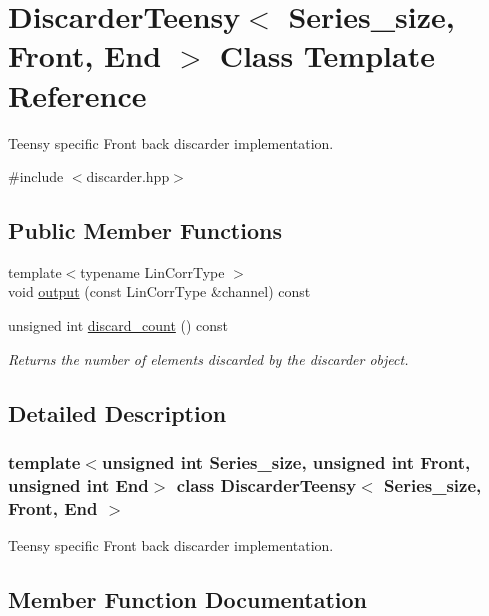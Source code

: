 \hypertarget{classDiscarderTeensy}{}\section{Discarder\+Teensy$<$ Series\+\_\+size, Front, End $>$ Class Template Reference}
\label{classDiscarderTeensy}


Teensy specific Front back discarder implementation.  




{\ttfamily \#include $<$discarder.\+hpp$>$}

\subsection*{Public Member Functions}
\begin{DoxyCompactItemize}
\item 
{\footnotesize template$<$typename Lin\+Corr\+Type $>$ }\\void \hyperlink{classDiscarderTeensy_ae7f8709724630ac3cc82a7a3ee202f2c}{output} (const Lin\+Corr\+Type \&channel) const
\item 
unsigned int \hyperlink{classDiscarderTeensy_acddeb78ebed208384b8ce100d9c503e6}{discard\+\_\+count} () const
\begin{DoxyCompactList}\small\item\em Returns the number of elements discarded by the discarder object. \end{DoxyCompactList}\end{DoxyCompactItemize}


\subsection{Detailed Description}
\subsubsection*{template$<$unsigned int Series\+\_\+size, unsigned int Front, unsigned int End$>$\newline
class Discarder\+Teensy$<$ Series\+\_\+size, Front, End $>$}

Teensy specific Front back discarder implementation. 

\subsection{Member Function Documentation}
\mbox{\label{classDiscarderTeensy_acddeb78ebed208384b8ce100d9c503e6}} 

